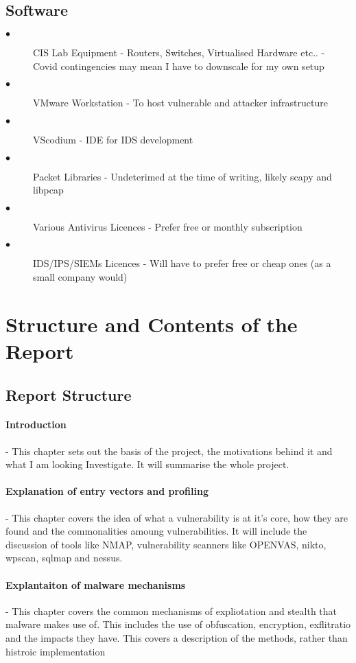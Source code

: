 \subsection{Software}
\begin{description}
	\item[$\bullet$] CIS Lab Equipment - Routers, Switches, Virtualised Hardware etc.. - Covid contingencies may mean I have to downscale for my own setup
	\item[$\bullet$] VMware Workstation - To host vulnerable and attacker infrastructure
	\item[$\bullet$] VScodium - IDE for IDS development
	\item[$\bullet$] Packet Libraries - Undeterimed at the time of writing, likely scapy and libpcap
	\item[$\bullet$] Various Antivirus Licences - Prefer free or monthly subscription
	\item[$\bullet$] IDS/IPS/SIEMs Licences - Will have to prefer free or cheap ones (as a small company would)
\end{description}

\section{Structure and Contents of the Report}
\subsection{Report Structure}

\paragraph{Introduction}  -  This chapter sets out the basis of the project, the motivations behind it and what I am looking Investigate. 
It will summarise the whole project.

\paragraph{Explanation of entry vectors and profiling} - This chapter covers the idea of what a vulnerability is at it's core, how they are found
and the commonalities amoung vulnerabilities. It will include the discussion of tools like NMAP, vulnerability scanners like OPENVAS, nikto, wpscan, sqlmap and nessus.

\paragraph{Explantaiton of malware mechanisms} - This chapter covers the common mechanisms of expliotation and stealth that malware makes use of. 
This includes the use of obfuscation, encryption, exflitratio and the impacts they have. This covers a description of the methods, rather than histroic implementation

